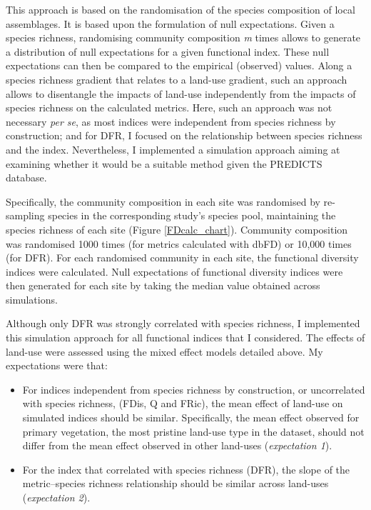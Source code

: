 This approach is based on the randomisation of the species composition of local assemblages.  It is based upon the formulation of null expectations.  Given a species richness, randomising community composition \textit{m} times allows to generate a distribution of null expectations for a given functional index. These null expectations can then be compared to the empirical (observed) values. Along a species richness gradient that relates to a land-use gradient, such an approach allows to disentangle the impacts of land-use independently from the impacts of species richness on the calculated metrics. Here, such an approach was not necessary \textit{per se}, as most indices were independent from species richness by construction; and for DFR, I focused on the relationship between species richness and the index. Nevertheless, I implemented a simulation approach aiming at examining whether it would be a suitable method given the PREDICTS database.

Specifically, the community composition in each site was randomised by re-sampling species in the corresponding study's species pool, maintaining the species richness of each site (Figure \ref{FDcalc_chart}). Community composition was randomised 1000 times (for metrics calculated with dbFD) or 10,000 times (for DFR). For each randomised community in each site, the functional diversity indices were calculated. Null expectations of functional diversity indices were then generated for each site by taking the median value obtained across simulations.

Although only DFR was strongly correlated with species richness, I implemented this simulation approach for all functional indices that I considered. The effects of land-use were assessed using the mixed effect models detailed above. My expectations were that:
\begin{itemize}
\item For indices independent from species richness by construction, or uncorrelated with species richness, (FDis, Q and FRic), the mean effect of land-use on simulated indices should be similar. Specifically, the mean effect observed for primary vegetation, the most pristine land-use type in the dataset, should not differ from the mean effect observed in other land-uses (\textit{expectation 1}).
\item For the index that correlated with species richness (DFR), the slope of the metric--species richness relationship should be similar across land-uses (\textit{expectation 2}). 
\end{itemize} 

